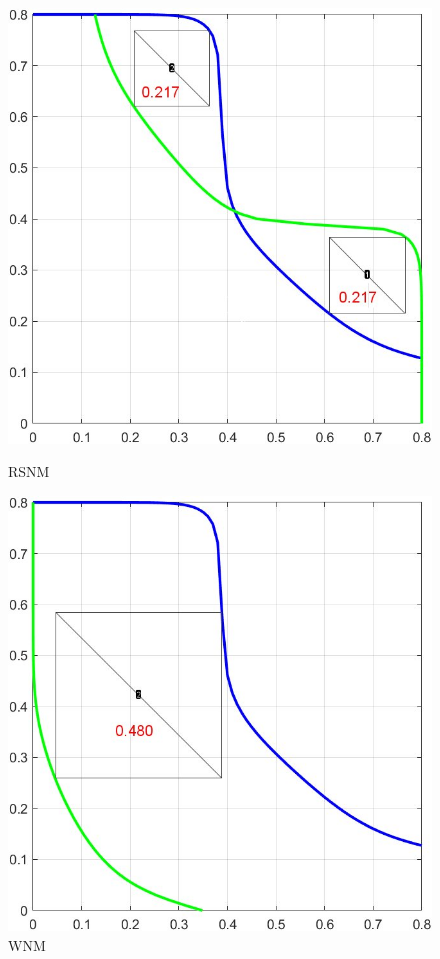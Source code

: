 \documentclass{article}
\begin{document}
\begin{figure}[H]
  \centering
  \begin{minipage}[t]{0.45\textwidth}
  \centering
      \includegraphics[width=\linewidth]{./img/2024-01-11-22-57-21.png}
  \caption{RSNM}
  \label{r8}
  \end{minipage}
  \qquad
  \begin{minipage}[t]{0.45\textwidth}
  \centering
      \includegraphics[width=\linewidth]{./img/2024-01-11-23-03-30.png}
  \caption{WNM}
  \label{w8}
  \end{minipage}
  \end{figure}
\end{document}
